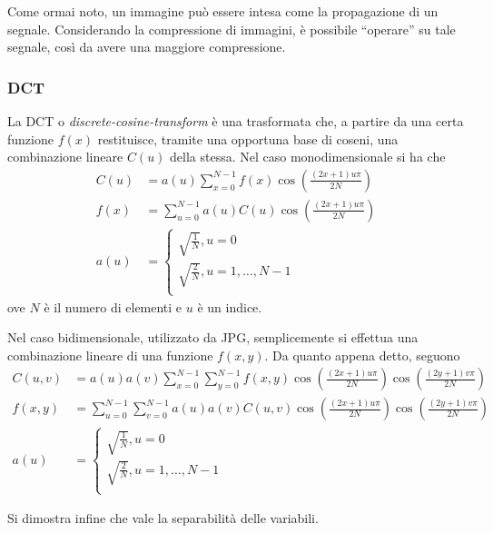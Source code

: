 \documentclass{subfiles}
\begin{document}
Come ormai noto, un immagine può essere intesa come la propagazione di un segnale.
Considerando la compressione di immagini, è possibile ``operare'' su tale segnale, così da avere una maggiore compressione.

\subsubsection{DCT}
La DCT o \emph{discrete-cosine-transform} è una trasformata che, a partire da una certa funzione \(f(x)\) restituisce, tramite una opportuna base di coseni,
una combinazione lineare \(C(u)\) della stessa. Nel caso monodimensionale si ha che
\[\begin{aligned}
        C(u) & = a(u) \sum\limits_{x = 0}^{N - 1}{f(x) \cos\left(\frac{(2x + 1) u\pi}{2N}\right)} \\
        f(x) & = \sum\limits_{u = 0}^{N - 1}{a(u) C(u) \cos\left(\frac{(2x + 1) u\pi}{2N}\right)} \\
        a(u) & = \begin{cases}
                     \sqrt{\frac{1}{N}}, u = 0                \\
                     \sqrt{\frac{2}{N}}, u = 1, \ldots, N - 1 \\
                 \end{cases}
    \end{aligned}\]
ove \(N\) è il numero di elementi e \(u\) è un indice.

Nel caso bidimensionale, utilizzato da JPG, semplicemente si effettua una combinazione lineare di una funzione \(f(x, y)\).
Da quanto appena detto, seguono
\[\begin{aligned}
        C(u, v) & = a(u)a(v) \sum\limits_{x = 0}^{N - 1}\sum\limits_{y = 0}^{N - 1}{f(x, y) \cos\left(\frac{(2x + 1) u\pi}{2N}\right) \cos\left(\frac{(2y + 1) v\pi}{2N}\right)} \\
        f(x, y) & = \sum\limits_{u = 0}^{N - 1}\sum\limits_{v = 0}^{N - 1}{a(u)a(v) C(u, v) \cos\left(\frac{(2x + 1) u\pi}{2N}\right) \cos\left(\frac{(2y + 1) v\pi}{2N}\right)} \\
        a(u)    & = \begin{cases}
                        \sqrt{\frac{1}{N}}, u = 0                \\
                        \sqrt{\frac{2}{N}}, u = 1, \ldots, N - 1 \\
                    \end{cases}
    \end{aligned}\]

Si dimostra infine che vale la separabilità delle variabili.
\end{document}
